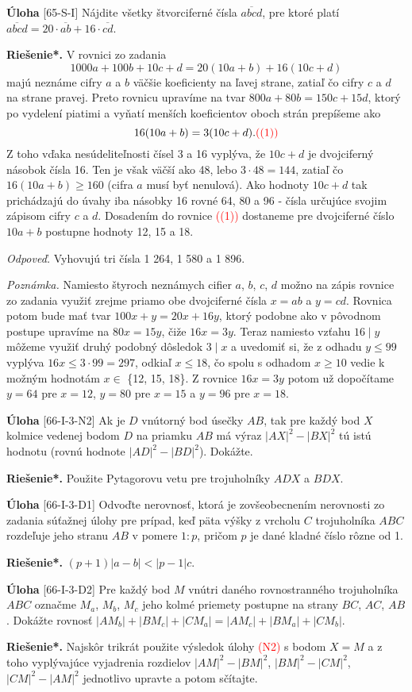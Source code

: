 \documentclass{article}
\newcommand{\rieh}{\textbf{Riešenie*.} }
\newcommand\todo[1]{\noindent\textcolor{red}{(#1)}}
\newcommand{\problem}[4]{
  \begin{tcolorbox}[breakable,notitle,boxrule=0pt,colback=light-gray,colframe=light-gray]
    \textbf{Úloha}
    [#1] #3
  \end{tcolorbox}
  \noindent#4
}
\begin{document}
\problem{65-S-I}{}{
 Nájdite všetky štvorciferné čísla $\overline{abcd}$, pre ktoré platí $\overline{abcd} = 20 \cdot \overline{ab} + 16 \cdot \overline{cd}$.
}{
\rieh V rovnici zo zadania
$$1 000a + 100b + 10c + d = 20(10a + b) + 16(10c + d)$$
majú neznáme cifry $a$ a $b$ väčšie koeficienty na ľavej strane, zatiaľ čo cifry $c$ a $d$ na strane pravej. Preto rovnicu upravíme na tvar $800a + 80b = 150c + 15d$, ktorý po vydelení piatimi a vyňatí menších koeficientov oboch strán prepíšeme ako
$$16(10a + b) = 3(10c + d). \todo{(1)}$$
Z toho vďaka nesúdeliteľnosti čísel 3 a 16 vyplýva, že $10c + d$ je dvojciferný násobok čísla 16. Ten je však väčší ako 48, lebo $3 \cdot 48 = 144$, zatiaľ čo $16(10a + b) \geq 160$ (cifra $a$ musí byť nenulová). Ako hodnoty $10c + d$ tak prichádzajú do úvahy iba násobky 16 rovné 64, 80 a 96 - čísla určujúce svojim zápisom cifry $c$ a $d$. Dosadením do rovnice \todo{(1)} dostaneme pre dvojciferné číslo $10a + b$ postupne hodnoty 12, 15 a 18.

\textit{Odpoveď.} Vyhovujú tri čísla 1 264, 1 580 a 1 896.

\textit{Poznámka.} Namiesto štyroch neznámych cifier $a$, $b$, $c$, $d$ možno na zápis rovnice zo zadania využiť zrejme priamo obe dvojciferné čísla $x = ab$ a $y = cd$. Rovnica potom bude mať tvar $100x+y = 20x+16y$, ktorý podobne ako v pôvodnom postupe upravíme na $80x = 15y$, čiže $16x = 3y$. Teraz namiesto vzťahu $16 \mid y$ môžeme využiť druhý podobný dôsledok $3 \mid x$ a uvedomiť si, že z odhadu $y \leq 99$  vyplýva $16x \leq 3 \cdot 99 = 297$, odkiaľ $x \leq 18$, čo spolu s odhadom $x \geq 10$ vedie k možným hodnotám $x \in$ \{12, 15, 18\}. Z rovnice $16x = 3y$ potom už dopočítame $y = 64$ pre $x = 12$, $y = 80$ pre $x = 15$ a  $y = 96$ pre $x = 18$.
}



\problem{66-I-3-N2}{}{
Ak je $D$ vnútorný bod úsečky $AB$, tak pre každý bod $X$ kolmice vedenej bodom $D$ na priamku $AB$ má výraz $|AX|^2-|BX|^2$ tú istú hodnotu (rovnú hodnote $|AD|^2 -|BD|^2$). Dokážte.
}{
\rieh Použite Pytagorovu vetu pre trojuholníky $ADX$ a $BDX$.
}

\problem{66-I-3-D1}{}{
Odvoďte nerovnosť, ktorá je zovšeobecnením nerovnosti zo zadania súťažnej úlohy pre prípad, keď päta výšky z vrcholu $C$ trojuholníka $ABC$ rozdeľuje jeho stranu $AB$ v pomere $1 : p$, pričom $p$ je dané kladné číslo rôzne od 1.
}{
\rieh $(p + 1)|a - b| < |p - 1|c.$
}


\problem{66-I-3-D2}{}{
Pre každý bod $M$ vnútri daného rovnostranného trojuholníka $ABC$ označme $M_a$, $M_b$, $M_c$ jeho kolmé priemety postupne na strany $BC$, $AC$, $AB$. Dokážte rovnosť $|AM_b|+ |BM_c| + |CM_a| = |AM_c| + |BM_a| + |CM_b|$.
}{
\rieh Najskôr trikrát použite výsledok úlohy \todo{N2} s bodom $X = M$ a z toho vyplývajúce vyjadrenia rozdielov $|AM|^2 - |BM|^2$, $|BM|^2- |CM|^2$, $|CM|^2 -|AM|^2$ jednotlivo upravte a potom sčítajte.
}
\end{document}

